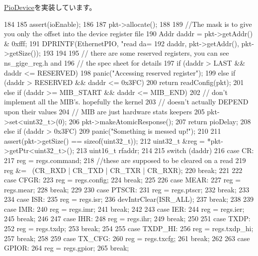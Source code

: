 \hyperlink{classPioDevice_a842312590432036092c422c87a442358}{PioDevice}を実装しています。


\begin{DoxyCode}
184 {
185     assert(ioEnable);
186 
187     pkt->allocate();
188 
189     //The mask is to give you only the offset into the device register file
190     Addr daddr = pkt->getAddr() & 0xfff;
191     DPRINTF(EthernetPIO, "read  da=%
192             daddr, pkt->getAddr(), pkt->getSize());
193 
194 
195     // there are some reserved registers, you can see ns_gige_reg.h and
196     // the spec sheet for details
197     if (daddr > LAST && daddr <=  RESERVED) {
198         panic("Accessing reserved register");
199     } else if (daddr > RESERVED && daddr <= 0x3FC) {
200         return readConfig(pkt);
201     } else if (daddr >= MIB_START && daddr <= MIB_END) {
202         // don't implement all the MIB's.  hopefully the kernel
203         // doesn't actually DEPEND upon their values
204         // MIB are just hardware stats keepers
205         pkt->set<uint32_t>(0);
206         pkt->makeAtomicResponse();
207         return pioDelay;
208     } else if (daddr > 0x3FC)
209         panic("Something is messed up!\n");
210 
211     assert(pkt->getSize() == sizeof(uint32_t));
212         uint32_t &reg = *pkt->getPtr<uint32_t>();
213         uint16_t rfaddr;
214 
215         switch (daddr) {
216           case CR:
217             reg = regs.command;
218             //these are supposed to be cleared on a read
219             reg &= ~(CR_RXD | CR_TXD | CR_TXR | CR_RXR);
220             break;
221 
222           case CFGR:
223             reg = regs.config;
224             break;
225 
226           case MEAR:
227             reg = regs.mear;
228             break;
229 
230           case PTSCR:
231             reg = regs.ptscr;
232             break;
233 
234           case ISR:
235             reg = regs.isr;
236             devIntrClear(ISR_ALL);
237             break;
238 
239           case IMR:
240             reg = regs.imr;
241             break;
242 
243           case IER:
244             reg = regs.ier;
245             break;
246 
247           case IHR:
248             reg = regs.ihr;
249             break;
250 
251           case TXDP:
252             reg = regs.txdp;
253             break;
254 
255           case TXDP_HI:
256             reg = regs.txdp_hi;
257             break;
258 
259           case TX_CFG:
260             reg = regs.txcfg;
261             break;
262 
263           case GPIOR:
264             reg = regs.gpior;
265             break;
}}
\end{DoxyCode}
